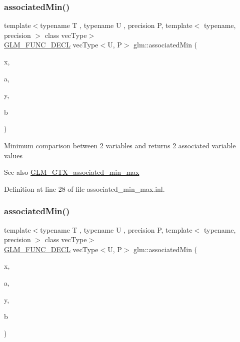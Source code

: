 \subsubsection{\texorpdfstring{associatedMin()}{associatedMin()}\hspace{0.1cm}{\footnotesize\ttfamily [3/10]}}
{\footnotesize\ttfamily template$<$typename T , typename U , precision P, template$<$ typename, precision $>$ class vec\+Type$>$ \\
\mbox{\hyperlink{setup_8hpp_ab2d052de21a70539923e9bcbf6e83a51}{G\+L\+M\+\_\+\+F\+U\+N\+C\+\_\+\+D\+E\+CL}} vec\+Type$<$U, P$>$ glm\+::associated\+Min (\begin{DoxyParamCaption}\item[{T}]{x,  }\item[{const vec\+Type$<$ U, P $>$ \&}]{a,  }\item[{T}]{y,  }\item[{const vec\+Type$<$ U, P $>$ \&}]{b }\end{DoxyParamCaption})}

Minimum comparison between 2 variables and returns 2 associated variable values \begin{DoxySeeAlso}{See also}
\mbox{\hyperlink{group__gtx__associated__min__max}{G\+L\+M\+\_\+\+G\+T\+X\+\_\+associated\+\_\+min\+\_\+max}} 
\end{DoxySeeAlso}


Definition at line 28 of file associated\+\_\+min\+\_\+max.\+inl.

\mbox{\label{group__gtx__associated__min__max_ga076717f4e07c6ae725cc1382d1ac4869}} 
\subsubsection{\texorpdfstring{associatedMin()}{associatedMin()}\hspace{0.1cm}{\footnotesize\ttfamily [4/10]}}
{\footnotesize\ttfamily template$<$typename T , typename U , precision P, template$<$ typename, precision $>$ class vec\+Type$>$ \\
\mbox{\hyperlink{setup_8hpp_ab2d052de21a70539923e9bcbf6e83a51}{G\+L\+M\+\_\+\+F\+U\+N\+C\+\_\+\+D\+E\+CL}} vec\+Type$<$U, P$>$ glm\+::associated\+Min (\begin{DoxyParamCaption}\item[{vec\+Type$<$ T, P $>$ const \&}]{x,  }\item[{U}]{a,  }\item[{vec\+Type$<$ T, P $>$ const \&}]{y,  }\item[{U}]{b }\end{DoxyParamCaption})}

